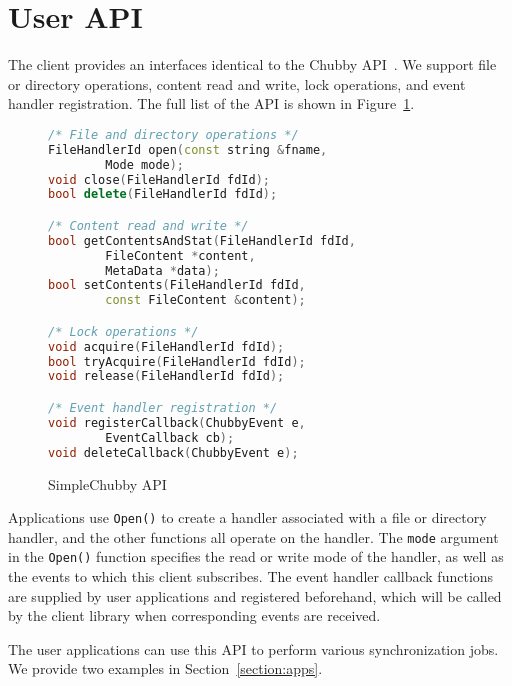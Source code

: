 \section{User API}
\label{section:api}

The client provides an interfaces identical to the Chubby API~\cite{burrows2006chubby}.
We support file or directory operations, content
read and write, lock operations, and event handler registration.
The full list of the API is shown in Figure~\ref{fig:api}.

\begin{figure}
\centering
\begin{lstlisting}[language=C++,
    basicstyle=\footnotesize\ttfamily,
    commentstyle=\bfseries,
    deletekeywords={delete},
    morekeywords={FileHandlerId, string, Mode, FileContent, MetaData, ChubbyEvent, EventCallback}]
/* File and directory operations */
FileHandlerId open(const string &fname,
        Mode mode);
void close(FileHandlerId fdId);
bool delete(FileHandlerId fdId);

/* Content read and write */
bool getContentsAndStat(FileHandlerId fdId,
        FileContent *content,
        MetaData *data);
bool setContents(FileHandlerId fdId,
        const FileContent &content);

/* Lock operations */
void acquire(FileHandlerId fdId);
bool tryAcquire(FileHandlerId fdId);
void release(FileHandlerId fdId);

/* Event handler registration */
void registerCallback(ChubbyEvent e,
        EventCallback cb);
void deleteCallback(ChubbyEvent e);
\end{lstlisting}
\caption{SimpleChubby API}
\label{fig:api}
\end{figure}

Applications use \texttt{Open()} to create a handler associated with a file
or directory handler, and the other functions all operate on the handler.
The \texttt{mode} argument in the \texttt{Open()} function specifies the read
or write mode of the handler, as well as the events to which this client subscribes.
The event handler callback functions are supplied by user applications and
registered beforehand, which will be called by the client library when
corresponding events are received.

The user applications can use this API to perform various synchronization
jobs. We provide two examples in Section~\ref{section:apps}.


